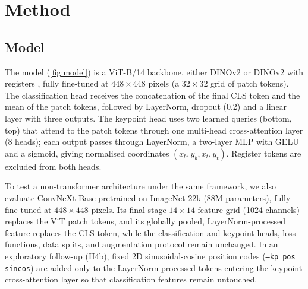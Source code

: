 \documentclass[11pt]{article}
\begin{document}
\section{Method}
\label{sec:method}

\subsection{Model}
The model (\cref{fig:model}) is a ViT-B/14 backbone, either DINOv2 \citep{oquab2024dinov2} or DINOv2 with
registers \citep{darcet2024registers}, fully fine-tuned at $448 \times 448$ pixels (a $32 \times 32$ grid of
patch tokens). The classification head receives the concatenation of the final CLS token and the mean of the
patch tokens, followed by LayerNorm, dropout (0.2) and a linear layer with three outputs. The keypoint head
uses two learned queries (bottom, top) that attend to the patch tokens through one multi-head
cross-attention layer (8 heads); each output passes through LayerNorm, a two-layer MLP with GELU and a
sigmoid, giving normalised coordinates $(x_b, y_b, x_t, y_t)$. Register tokens are excluded from both heads.

To test a non-transformer architecture under the same framework, we also evaluate ConvNeXt-Base pretrained on ImageNet-22k \citep{liu2022convnext} (88M parameters), fully fine-tuned at $448 \times 448$ pixels. Its final-stage $14 \times 14$ feature grid (1024 channels) replaces the ViT patch tokens, and its globally pooled, LayerNorm-processed feature replaces the CLS token, while the classification and keypoint heads, loss functions, data splits, and augmentation protocol remain unchanged. In an exploratory follow-up (H4b), fixed 2D sinusoidal-cosine position codes (\texttt{--kp\_pos sincos}) are added only to the LayerNorm-processed tokens entering the keypoint cross-attention layer so that classification features remain untouched.
\end{document}
